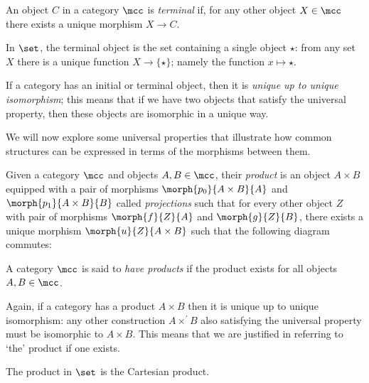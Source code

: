 \begin{definition}
    An object \(C\) in a category \(\mcc\) is \emph{terminal} if, for any other
    object \(X \in \mcc\) there exists a unique morphism \(X \to C\).
\end{definition}

\begin{example}
    In \(\set\), the terminal object is the set containing a single object
    \(\star\): from any set \(X\) there is a unique function
    \(X \to \{\star\}\); namely the function \(x \mapsto \star\).
\end{example}

If a category has an initial or terminal object, then it is
\emph{unique up to unique isomorphism}; this means that if we have two objects
that satisfy the universal property, then these objects are isomorphic in a
unique way.

We will now explore some universal properties that illustrate how common
structures can be expressed in terms of the morphisms between them.

\begin{definition}[Product]\label{def:product}
    Given a category \(\mcc\) and objects \(A,B \in \mcc\), their \emph{product}
    is an object \(A \times B\) equipped with a pair of morphisms
    \(\morph{p_0}{A \times B}{A}\) and \(\morph{p_1}{A \times B}{B}\) called
    \emph{projections} such that for every other object \(Z\) with pair of
    morphisms \(\morph{f}{Z}{A}\) and \(\morph{g}{Z}{B}\), there exists a unique
    morphism \(\morph{u}{Z}{A \times B}\) such that the following diagram
    commutes:
    \begin{center}
        
    \end{center}
    A category \(\mcc\) is said to \emph{have products} if the product exists
    for all objects \(A,B \in \mcc\).
\end{definition}

Again, if a category has a product \(A \times B\) then it is unique up to unique
isomorphism: any other construction \(A \times^\prime B\) also satisfying the
universal property must be isomorphic to \(A \times B\).
This means that we are justified in referring to `the' product if one exists.

\begin{example}
    The product in \(\set\) is the Cartesian product.
\end{example}

